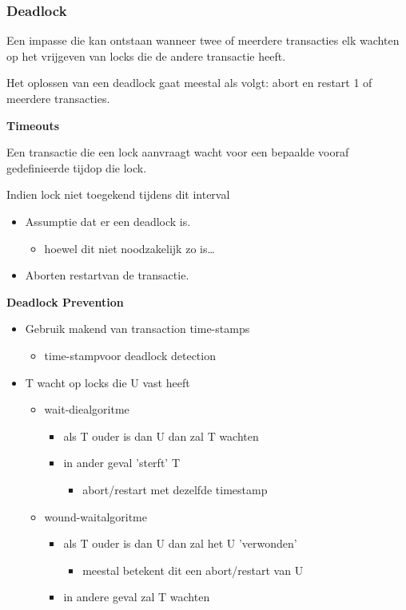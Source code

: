 \documentclass[a4paper,12pt]{article}
\begin{document}
\subsubsection{Deadlock}
Een impasse die kan ontstaan wanneer twee of meerdere transacties elk wachten op het vrijgeven van locks die de andere transactie heeft.

Het oplossen van een deadlock gaat meestal als volgt:
abort en restart 1 of meerdere transacties.

\textbf{Timeouts}

Een transactie die een lock aanvraagt wacht voor een bepaalde vooraf gedefinieerde tijdop die lock.

Indien lock niet toegekend tijdens dit interval
\begin{itemize}
\item Assumptie dat er een deadlock is.
	\begin{itemize}
	\item hoewel dit niet noodzakelijk zo is\dots
	\end{itemize}
\item Aborten restartvan de transactie.
\end{itemize}

\textbf{Deadlock Prevention}

\begin{itemize}
\item Gebruik makend van transaction time-stamps
	\begin{itemize}
	\item time-stampvoor deadlock detection
	\end{itemize} 
\item T wacht op locks die U vast heeft
	\begin{itemize}
	\item wait-diealgoritme
		\begin{itemize}
		\item als T ouder is dan U dan zal T wachten
		\item in ander geval 'sterft' T
			\begin{itemize}
			\item abort/restart met dezelfde timestamp
			\end{itemize}
		\end{itemize}
	\item wound-waitalgoritme
		\begin{itemize}
		\item als T ouder is dan U dan zal het U 'verwonden'
			\begin{itemize}
			\item meestal betekent dit een abort/restart van U
			\end{itemize}
		\item in andere geval zal T wachten
		\end{itemize}
	\end{itemize}
\end{itemize}
\end{document}
